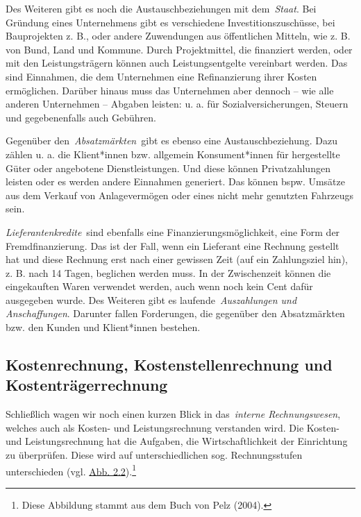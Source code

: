 \documentclass[
  letterpaper,
]{book}
\begin{document}
Des Weiteren gibt es noch die Austauschbeziehungen mit dem~\emph{Staat}.
Bei Gründung eines Unternehmens gibt es verschiedene
Investitionszuschüsse, bei Bauprojekten z. B., oder andere Zuwendungen
aus öffentlichen Mitteln, wie z. B. von Bund, Land und Kommune. Durch
Projektmittel, die finanziert werden, oder mit den Leistungsträgern
können auch Leistungsentgelte vereinbart werden. Das sind Einnahmen, die
dem Unternehmen eine Refinanzierung ihrer Kosten ermöglichen. Darüber
hinaus muss das Unternehmen aber dennoch -- wie alle anderen Unternehmen
-- Abgaben leisten: u. a. für Sozialversicherungen, Steuern und
gegebenenfalls auch Gebühren.

Gegenüber den~\emph{Absatzmärkten}~gibt es ebenso eine
Austauschbeziehung. Dazu zählen u. a. die Klient*innen bzw. allgemein
Konsument*innen für hergestellte Güter oder angebotene Dienstleistungen.
Und diese können Privatzahlungen leisten oder es werden andere Einnahmen
generiert. Das können bspw. Umsätze aus dem Verkauf von Anlagevermögen
oder eines nicht mehr genutzten Fahrzeugs sein.

\emph{Lieferantenkredite}~sind ebenfalls eine Finanzierungsmöglichkeit,
eine Form der Fremdfinanzierung. Das ist der Fall, wenn ein Lieferant
eine Rechnung gestellt hat und diese Rechnung erst nach einer gewissen
Zeit (auf ein Zahlungsziel hin), z. B. nach 14 Tagen, beglichen werden
muss. In der Zwischenzeit können die eingekauften Waren verwendet
werden, auch wenn noch kein Cent dafür ausgegeben wurde. Des Weiteren
gibt es laufende~\emph{Auszahlungen und Anschaffungen}. Darunter fallen
Forderungen, die gegenüber den Absatzmärkten bzw. den Kunden und
Klient*innen bestehen.

\subsection{Kostenrechnung, Kostenstellenrechnung und
Kostenträgerrechnung}\label{kostenrechnung-kostenstellenrechnung-und-kostentrgerrechnung}

Schließlich wagen wir noch einen kurzen Blick in das~\emph{interne
Rechnungswesen}, welches auch als Kosten- und Leistungsrechnung
verstanden wird. Die Kosten- und Leistungsrechnung hat die Aufgaben, die
Wirtschaftlichkeit der Einrichtung zu überprüfen. Diese wird auf
unterschiedlichen sog. Rechnungsstufen unterschieden (vgl.
\hyperref[figure32]{Abb. 2.2}).\footnote{Diese Abbildung stammt aus dem
  Buch von Pelz (2004).}
\end{document}
